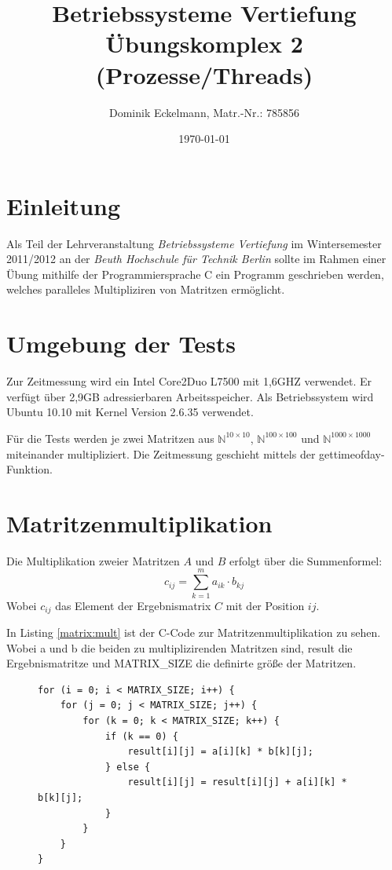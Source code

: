 \documentclass[a4paper]{article}
\title{Betriebssysteme Vertiefung \\ Übungskomplex 2 (Prozesse/Threads)}
\author{Dominik Eckelmann, Matr.-Nr.: 785856}
\date{\today}
\begin{document}
\maketitle

\tableofcontents

\section{Einleitung}
Als Teil der Lehrveranstaltung \textit{Betriebssysteme Vertiefung} im Wintersemester 2011/2012 an der \textit{Beuth Hochschule für Technik Berlin} sollte im Rahmen einer Übung mithilfe der Programmiersprache C ein Programm geschrieben werden, welches paralleles Multipliziren von Matritzen
ermöglicht.

\section{Umgebung der Tests}
Zur Zeitmessung wird ein Intel Core2Duo L7500 mit 1,6GHZ verwendet. Er verfügt über 2,9GB
adressierbaren Arbeitsspeicher. Als Betriebssystem wird Ubuntu 10.10 mit Kernel Version
2.6.35 verwendet.

Für die Tests werden je zwei Matritzen aus $\mathds{N}^{10\times10}$, $\mathds{N}^{100\times100}$ und
$\mathds{N}^{1000\times1000}$ miteinander multipliziert. Die Zeitmessung geschieht mittels der gettimeofday-Funktion.

\section{Matritzenmultiplikation}
Die Multiplikation zweier Matritzen $A$ und $B$ erfolgt über die Summenformel:
\[ c_{ij}=\sum_{k=1}^m a_{ik}\cdot b_{kj} \]
Wobei $c_{ij}$ das Element der Ergebnismatrix $C$ mit der Position $ij$.

In Listing \ref{matrix:mult} ist der C-Code zur Matritzenmultiplikation zu sehen.
Wobei a und b die beiden zu multiplizirenden Matritzen sind, result die Ergebnismatritze
und MATRIX\_SIZE die definirte größe der Matritzen.

\begin{figure}[h!]
\begin{lstlisting}
for (i = 0; i < MATRIX_SIZE; i++) {
	for (j = 0; j < MATRIX_SIZE; j++) {
		for (k = 0; k < MATRIX_SIZE; k++) {
			if (k == 0) {
				result[i][j] = a[i][k] * b[k][j];
			} else {
				result[i][j] = result[i][j] + a[i][k] * b[k][j];
			}
		}
	}
}
\end{lstlisting}
\end{figure}
\end{document}
